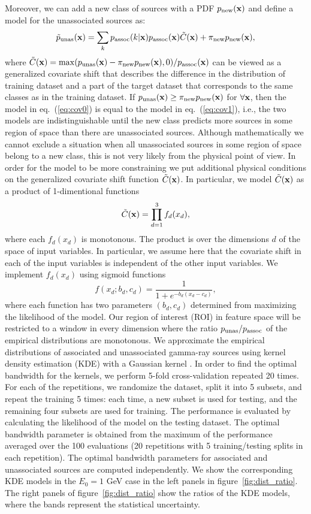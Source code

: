 \documentclass[12pt, a4paper]{article}
\newcommand{\be}{\begin{equation}}
\newcommand{\ee}{\end{equation}}
\newcommand{\bx}{{\bf x}}
\begin{document}
Moreover, we can add a new class of sources with a PDF 
$p_{\rm new}(\bx)$ and define a model for the unassociated sources as:
\be
\label{eq:cov1}
\tilde{p}_{\rm unas}(\bx) 
= \sum_k p_{\rm assoc}(k|\bx) p_{\rm assoc}(\bx) \tilde{C}(\bx) + \pi_{\rm new} p_{\rm new}(\bx),
\ee
where 
$\tilde{C}(\bx) = {\rm max}(p_{\rm unas}(\bx) - \pi_{\rm new}p_{\rm new}(\bx), 0) / p_{\rm assoc}(\bx)$ can be viewed as a generalized covariate shift that describes the difference in the distribution of training dataset and a part of the target dataset that corresponds to the same classes as in the training dataset.
If $p_{\rm unas}(\bx) \geq \pi_{\rm new}p_{\rm new}(\bx)$ for $\forall \bx$, then the model in eq.~(\ref{eq:cov0}) is equal to the model in eq.~(\ref{eq:cov1}), i.e., the two models are indistinguishable until the new class predicts more sources in some region of space than there are unassociated sources.
Although mathematically we cannot exclude a situation when all unassociated sources in some region of space belong to a new class, this is not very likely from the physical point of view.
In order for the model to be more constraining we put additional physical conditions on the generalized covariate shift function $\tilde{C}(\bx)$.
In particular, we model $\tilde{C}(\bx)$ as a product of 1-dimentional functions
\be
\label{eq:cov_model}
\tilde{C}(\bx) = \prod_{d=1}^3 f_d(x_d),
\ee
where each $f_d(x_d)$ is monotonous. 
The product is over the dimensions $d$ of the space of input variables. 
In particular, we assume here that the covariate shift in each of the input variables is independent of the other input variables.  
We implement $f_d(x_d)$ using sigmoid functions
\be
\label{eq:sigmoid}
f(x_d;b_d,c_d) = \frac{1}
{1+e^{-b_d(x_d - c_d)}},
\ee
where each function has two parameters $(b_d,c_d)$ determined from maximizing the likelihood of the model. 
Our region of interest (ROI) in feature space will be restricted to a window in every dimension where the ratio 
$p_{\rm unas}/p_{\rm assoc}$ 
of the empirical distributions are monotonous. 
We approximate the empirical distributions of associated and unassociated gamma-ray sources using kernel density estimation (KDE) with a Gaussian kernel \cite{bishop}. 
In order to find the optimal bandwidth for the kernels, we perform 5-fold cross-validation repeated 20 times. 
For each of the repetitions, we randomize the dataset,  split it into 5 subsets, and repeat the training 5 times: each time, a new subset is used for testing, and the remaining four subsets are used for training.
The performance is evaluated by calculating the likelihood of the model on the testing dataset.
The optimal bandwidth parameter is obtained from the maximum of the performance averaged over the 100 evaluations (20 repetitions with 5 training/testing splits in each repetition).
The optimal bandwidth parameters for associated and unassociated sources are computed independently.
We show the corresponding KDE models in the $E_0 = 1$ GeV case in the left panels in figure~\ref{fig:dist_ratio}.
The right panels of figure~\ref{fig:dist_ratio} show the ratios of the KDE models, where the bands represent the statistical uncertainty.
\end{document}
